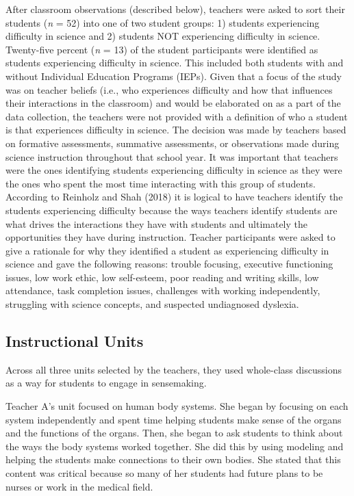 \documentclass{sig-alternate} %
\begin{document}
\begin{large}
After classroom observations (described below), teachers were asked to sort their students (\textit{n} = 52) into one of two student groups: 1) students experiencing difficulty in science and 2) students NOT experiencing difficulty in science. Twenty-five percent (\textit{n} = 13) of the student participants were identified as students experiencing difficulty in science. This included both students with and without Individual Education Programs (IEPs). Given that a focus of the study was on teacher beliefs (i.e., who experiences difficulty and how that influences their interactions in the classroom) and would be elaborated on as a part of the data collection, the teachers were not provided with a definition of who a student is that experiences difficulty in science. The decision was made by teachers based on formative assessments, summative assessments, or observations made during science instruction throughout that school year. It was important that teachers were the ones identifying students experiencing difficulty in science as they were the ones who spent the most time interacting with this group of students. According to Reinholz and Shah (2018) it is logical to have teachers identify the students experiencing difficulty because the ways teachers identify students are what drives the interactions they have with students and ultimately the opportunities they have during instruction. Teacher participants were asked to give a rationale for why they identified a student as experiencing difficulty in science and gave the following reasons: trouble focusing, executive functioning issues, low work ethic, low self-esteem, poor reading and writing skills, low attendance, task completion issues, challenges with working independently, struggling with science concepts, and suspected undiagnosed dyslexia. 

\subsection*{Instructional Units}

Across all three units selected by the teachers, they used whole-class discussions as a way for students to engage in sensemaking. 

Teacher A’s unit focused on human body systems. She began by focusing on each system independently and spent time helping students make sense of the organs and the functions of the organs. Then, she began to ask students to think about the ways the body systems worked together. She did this by using modeling and helping the students make connections to their own bodies. She stated that this content was critical because so many of her students had future plans to be nurses or work in the medical field. 


\end{large}
\end{document}
